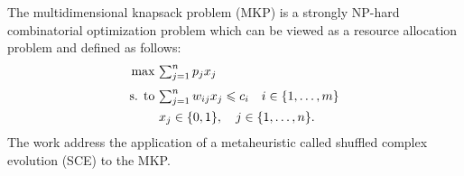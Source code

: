 The multidimensional knapsack problem (MKP) is a strongly NP-hard combinatorial
optimization problem which can be viewed as a resource allocation problem and
defined as follows:
\vspace{-15pt}
\begin{align*}
    \text{max} ~ & {\textstyle \sum_{j=1}^n p_j x_j} \\[3pt]
    \text{s. to} ~ & {\textstyle \sum_{j=1}^n w_{ij} x_j \leqslant c_i \quad i \in \{1, \ldots, m\}}\\
   & x_j \in \{0, 1\}, \quad j \in \{1, \ldots, n\}.
\end{align*}
\vspace{30pt}
The work address the application of a metaheuristic called
shuffled complex evolution (SCE) to the MKP.
